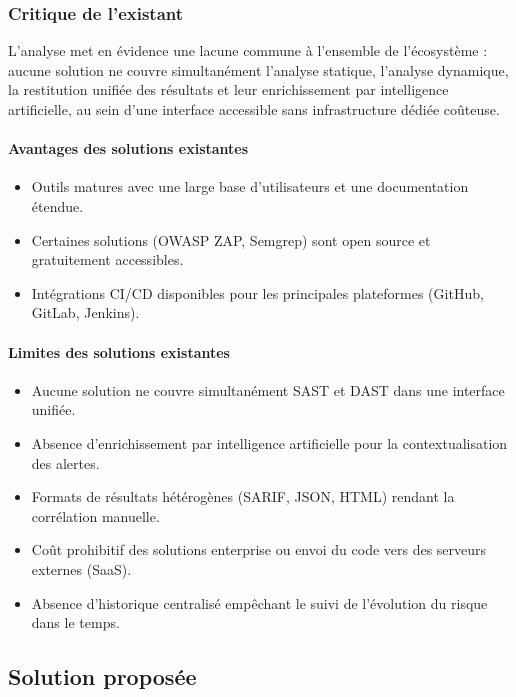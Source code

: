 \subsubsection{Critique de l'existant}

L'analyse met en évidence une lacune commune à l'ensemble de l'écosystème : aucune solution ne couvre simultanément l'analyse statique, l'analyse dynamique, la restitution unifiée des résultats et leur enrichissement par intelligence artificielle, au sein d'une interface accessible sans infrastructure dédiée coûteuse.

\paragraph{Avantages des solutions existantes}
\begin{itemize}
  \item Outils matures avec une large base d'utilisateurs et une documentation étendue.
  \item Certaines solutions (OWASP ZAP, Semgrep) sont open source et gratuitement accessibles.
  \item Intégrations CI/CD disponibles pour les principales plateformes (GitHub, GitLab, Jenkins).
\end{itemize}

\paragraph{Limites des solutions existantes}
\begin{itemize}
  \item Aucune solution ne couvre simultanément SAST et DAST dans une interface unifiée.
  \item Absence d'enrichissement par intelligence artificielle pour la contextualisation des alertes.
  \item Formats de résultats hétérogènes (SARIF, JSON, HTML) rendant la corrélation manuelle.
  \item Coût prohibitif des solutions enterprise ou envoi du code vers des serveurs externes (SaaS).
  \item Absence d'historique centralisé empêchant le suivi de l'évolution du risque dans le temps.
\end{itemize}

\subsection{Solution proposée}


